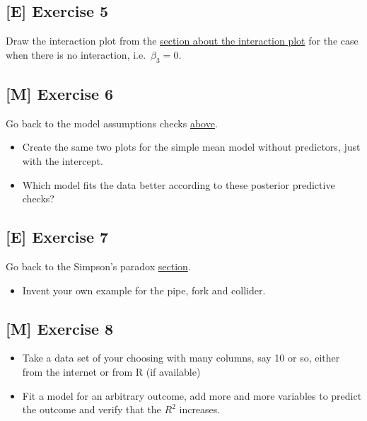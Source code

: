\documentclass[
]{book}
\providecommand{\tightlist}{%
  \setlength{\itemsep}{0pt}\setlength{\parskip}{0pt}}
\begin{document}
\subsection{{[}E{]} Exercise 5}\label{exercise5_multiple_regression}

Draw the interaction plot from the \hyperref[interaction_plot]{section about the interaction plot}
for the case when there is no interaction, i.e.~\(\beta_3 = 0\).

\subsection{{[}M{]} Exercise 6}\label{exercise6_multiple_regression}

Go back to the model assumptions checks \hyperref[check_model_bayes]{above}.

\begin{itemize}
\tightlist
\item
  Create the same two plots for the simple mean model without predictors, just with the intercept.
\item
  Which model fits the data better according to these posterior predictive checks?
\end{itemize}

\subsection{{[}E{]} Exercise 7}\label{exercise7_multiple_regression}

Go back to the Simpson's paradox \hyperref[simpsons_paradox]{section}.

\begin{itemize}
\tightlist
\item
  Invent your own example for the pipe, fork and collider.
\end{itemize}

\subsection{{[}M{]} Exercise 8}\label{exercise8_multiple_regression}

\begin{itemize}
\tightlist
\item
  Take a data set of your choosing with many columns, say 10 or so, either from the internet
  or from R (if available)
\item
  Fit a model for an arbitrary outcome, add more and more variables to predict the outcome
  and verify that the \(R^2\) increases.
\end{itemize}
\end{document}
